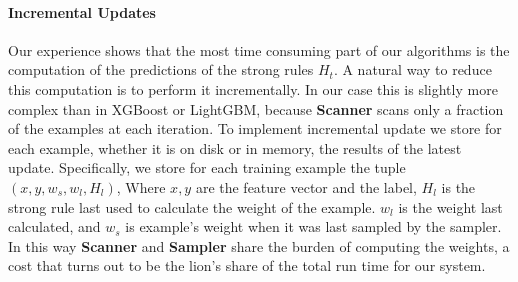 \paragraph*{Incremental Updates} Our experience shows that the most
time consuming part of our algorithms is the computation of the
predictions of the strong rules $H_t$. A natural way to reduce this
computation is to perform it incrementally. In our case this is
slightly more complex than in XGBoost or LightGBM, because {\bf
  Scanner} scans only a  fraction of the examples at each
iteration. To implement incremental update we store for each example,
whether it is on disk or in memory, the results of the latest
update. Specifically, we store for each training example the tuple
$(x, y, w_s, w_l,H_l)$, Where $x,y$ are the feature vector and the
label, $H_l$ is the strong rule last used to calculate the weight of
the example. $w_l$ is the weight last calculated, and $w_s$ is
example's weight when it was last sampled by the sampler. In this way
{\bf Scanner} and {\bf Sampler} share the burden of computing
the weights, a cost that turns out to be the lion's share of the total
run time for our system.






